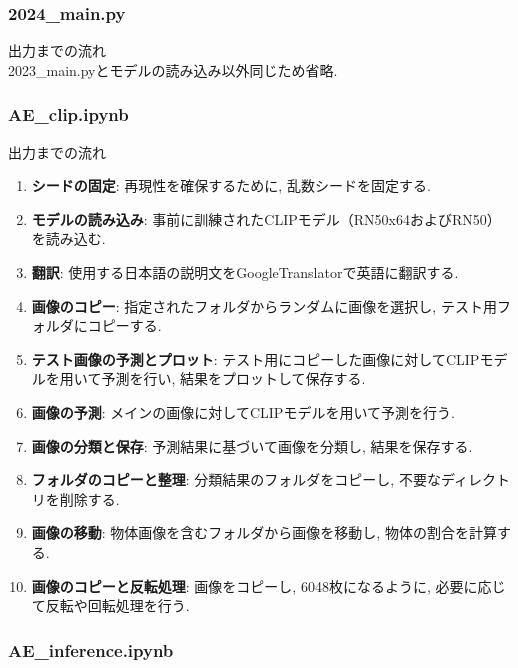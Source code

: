 \documentclass[a4paper, 12pt]{report}
\begin{document}
\subsubsection{\textbf{2024\_main.py}}

出力までの流れ\\

2023\_main.pyとモデルの読み込み以外同じため省略. 

\subsubsection{\textbf{AE\_clip.ipynb}}

出力までの流れ
\begin{enumerate}
    \item \textbf{シードの固定}: 再現性を確保するために, 乱数シードを固定する. 
    \item \textbf{モデルの読み込み}: 事前に訓練されたCLIPモデル（RN50x64およびRN50）を読み込む. 
    \item \textbf{翻訳}: 使用する日本語の説明文をGoogleTranslatorで英語に翻訳する. 
    \item \textbf{画像のコピー}: 指定されたフォルダからランダムに画像を選択し, テスト用フォルダにコピーする. 
    \item \textbf{テスト画像の予測とプロット}: テスト用にコピーした画像に対してCLIPモデルを用いて予測を行い, 結果をプロットして保存する. 
    \item \textbf{画像の予測}: メインの画像に対してCLIPモデルを用いて予測を行う. 
    \item \textbf{画像の分類と保存}: 予測結果に基づいて画像を分類し, 結果を保存する. 
    \item \textbf{フォルダのコピーと整理}: 分類結果のフォルダをコピーし, 不要なディレクトリを削除する. 
    \item \textbf{画像の移動}: 物体画像を含むフォルダから画像を移動し, 物体の割合を計算する. 
    \item \textbf{画像のコピーと反転処理}: 画像をコピーし, 6048枚になるように, 必要に応じて反転や回転処理を行う. 
\end{enumerate}

\subsubsection{\textbf{AE\_inference.ipynb}}
\end{document}
